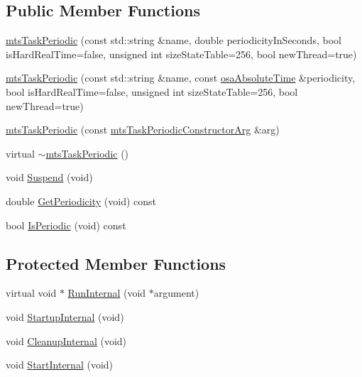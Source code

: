 \subsection*{Public Member Functions}
\begin{DoxyCompactItemize}
\item 
\hyperlink{classmts_task_periodic_a25f41126d8b23b5b5b60d6b6f374bff1}{mts\-Task\-Periodic} (const std\-::string \&name, double periodicity\-In\-Seconds, bool is\-Hard\-Real\-Time=false, unsigned int size\-State\-Table=256, bool new\-Thread=true)
\item 
\hyperlink{classmts_task_periodic_a3489ad68db155dbd1db291c30aafd496}{mts\-Task\-Periodic} (const std\-::string \&name, const \hyperlink{structosa_absolute_time}{osa\-Absolute\-Time} \&periodicity, bool is\-Hard\-Real\-Time=false, unsigned int size\-State\-Table=256, bool new\-Thread=true)
\item 
\hyperlink{classmts_task_periodic_a49faf52b10d7aca0978a61a6cd27b60c}{mts\-Task\-Periodic} (const \hyperlink{classmts_task_periodic_constructor_arg}{mts\-Task\-Periodic\-Constructor\-Arg} \&arg)
\item 
virtual \hyperlink{classmts_task_periodic_a09448e25ee409df689315ab951036b71}{$\sim$mts\-Task\-Periodic} ()
\item 
void \hyperlink{classmts_task_periodic_af3e36d8b4f558dc69e9667ed060828cf}{Suspend} (void)
\item 
double \hyperlink{classmts_task_periodic_ac4a9e6bd9e5eb0b8e54acb4f29d7aebe}{Get\-Periodicity} (void) const 
\item 
bool \hyperlink{classmts_task_periodic_af825cb47ff69d22024981da77ddcf2c2}{Is\-Periodic} (void) const 
\end{DoxyCompactItemize}
\subsection*{Protected Member Functions}
\begin{DoxyCompactItemize}
\item 
virtual void $\ast$ \hyperlink{classmts_task_periodic_aabe3aa8bd8d2b8d3ca488cfbe19a2c63}{Run\-Internal} (void $\ast$argument)
\item 
void \hyperlink{classmts_task_periodic_a18cf3343b3fccacc4966ed1356fad70c}{Startup\-Internal} (void)
\item 
void \hyperlink{classmts_task_periodic_a9c53e006fe135c78d64a71790b9a6000}{Cleanup\-Internal} (void)
\item 
void \hyperlink{classmts_task_periodic_ac593dd5d4352b12308c86b9a8df0c322}{Start\-Internal} (void)
\end{DoxyCompactItemize}
